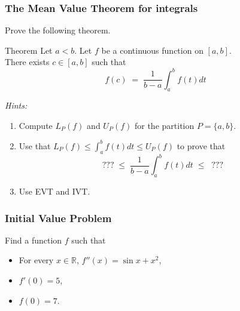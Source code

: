\documentclass[14pt]{beamer}
\begin{document}
\begin{frame}[t]
	\fontsize{13}{13}\selectfont
	\frametitle{The Mean Value Theorem for integrals}

	Prove the following theorem.

	\begin{block}{\fontsize{13}{13}\selectfont Theorem}
		Let $a < b$. Let $f$ be a continuous function on $[a,b]$. \\ There exists $c
		\in [a,b]$ such that
		\vspace{-.5cm}
		\[
			f(c) \; = \; \frac{1}{b-a}\int_{a}^{b}f(t) dt
		\]
	\end{block}


	\emph{Hints:}
	\begin{enumerate}
		\item Compute $L_{P}(f)$ and $U_{P}(f)$ for the partition $\displaystyle P=\{
			a,b\}$.

		\item Use that $\displaystyle L_{P}(f) \leq \int_{a}^{b}f(t)dt \leq U_{P}(f)$
			to prove that
			\vspace{-.6cm}
			\
			\[
				??? \; \leq \; \frac{1}{b-a}\int_{a}^{b}f(t) dt \; \leq \; \; ???
			\]
			\vspace{-.6cm}

		\item Use EVT and IVT.
	\end{enumerate}
\end{frame}

\begin{frame}[t]
	\frametitle{Initial Value Problem}

	Find a function $f$ such that
	\begin{itemize}
		\item For every $\displaystyle x \in \mathbb{R}$,
			$\displaystyle f''(x) = \sin x + x^{2}$,

		\item $\displaystyle f'(0) = 5$,

		\item $\displaystyle f(0) = 7$.
	\end{itemize}
\end{frame}
\end{document}
